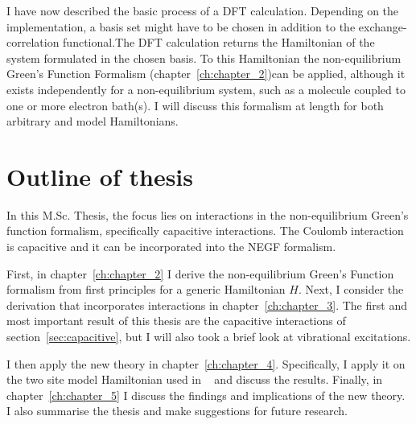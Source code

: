 I have now described the basic process of a DFT calculation. Depending on the implementation, a basis set might have to be chosen in addition to the exchange\hyp{}correlation functional.The DFT calculation returns the Hamiltonian of the system formulated in the chosen basis. To this Hamiltonian the non-equilibrium Green's Function Formalism (chapter~\ref{ch:chapter_2})can be applied, although it exists independently for a non-equilibrium system, such as a molecule coupled to one or more electron bath(s). I will discuss this formalism at length for both arbitrary and model Hamiltonians.

\section{Outline of thesis}
In this M.Sc. Thesis, the focus lies on interactions in the non-equilibrium Green's function formalism, specifically capacitive interactions. The Coulomb interaction is capacitive and it can be incorporated into the NEGF formalism.

First, in chapter~\ref{ch:chapter_2} I derive the non-equilibrium Green's Function formalism from first principles for a generic Hamiltonian $H$. Next, I consider the derivation that incorporates interactions in chapter~\ref{ch:chapter_3}. The first and most important result of this thesis are the capacitive interactions of section~\ref{sec:capacitive}, but I will also took a brief look at vibrational excitations.

I then apply the new theory  in chapter~\ref{ch:chapter_4}. Specifically, I apply it on the two site model Hamiltonian used in ~\citet{perrinnano} and discuss the results. Finally, in chapter~\ref{ch:chapter_5} I discuss the findings and implications of the new theory. I also summarise the thesis and make suggestions for future research.

\clearpage
{}